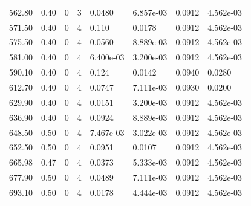 \documentclass[preview]{standalone}
\begin{document}
{{{{\begin{tabular}{L{1.2cm}C{1.2cm} C{0.3cm}C{0.5cm} C{1.4cm}C{1.4cm} C{1.4cm}C{1.4cm}}
  562.80  &  0.40  & 0     &  3 &  0.0480  & 6.857e-03  & 0.0912 &  4.562e-03   \\ 
  571.50  &  0.40  & 0     &  4 &  0.110  & 0.0178  & 0.0912 &  4.562e-03   \\ 
  575.50  &  0.40  & 0     &  4 &  0.0560  & 8.889e-03  & 0.0912 &  4.562e-03   \\ 
  581.00  &  0.40  & 0     &  4 &  6.400e-03  & 3.200e-03  & 0.0912 &  4.562e-03   \\ 
  590.10  &  0.40  & 0     &  4 &  0.124  & 0.0142  & 0.0940 &  0.0280   \\ 
  612.70  &  0.40  & 0     &  4 &  0.0747  & 7.111e-03  & 0.0930 &  0.0200   \\ 
  629.90  &  0.40  & 0     &  4 &  0.0151  & 3.200e-03  & 0.0912 &  4.562e-03   \\ 
  636.90  &  0.40  & 0     &  4 &  0.0924  & 8.889e-03  & 0.0912 &  4.562e-03   \\ 
  648.50  &  0.50  & 0     &  4 &  7.467e-03  & 3.022e-03  & 0.0912 &  4.562e-03   \\ 
  652.50  &  0.50  & 0     &  4 &  0.0951  & 0.0107  & 0.0912 &  4.562e-03   \\ 
  665.98  &  0.47  & 0     &  4 &  0.0373  & 5.333e-03  & 0.0912 &  4.562e-03   \\ 
  677.90  &  0.50  & 0     &  4 &  0.0489  & 7.111e-03  & 0.0912 &  4.562e-03   \\ 
  693.10  &  0.50  & 0     &  4 &  0.0178  & 4.444e-03  & 0.0912 &  4.562e-03   \\ 
\hline 
\end{tabular} 

}}}}
\end{document}
